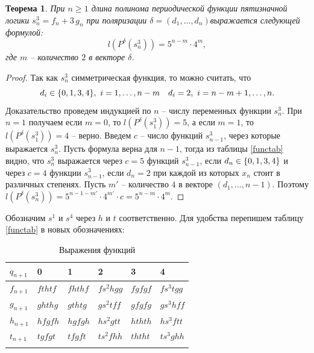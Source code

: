 \documentclass[bibliography=totoc, a4paper, 14pt]{extarticle}
\newtheorem{myth}{Теорема}
\def\in{\mathchar"3232\nobreak\discretionary{}{\usefont{OMS}{cmsy}{m}{n}\char50}{}}
\begin{document}
\begin{myth}
\label{ths3}
При $n \geqslant 1$ длина полинома периодической функции пятизначной логики ${s^3_n = f_n + 3\,g_n}$
при поляризации $\delta = (d_1,\ldots,d_n)$выражается следующей формулой:
$$ l(P^{\delta}(s^3_n)) = 5^{n-m} \cdot 4^m ,$$
где $m$ -- количество $2$ в векторе $\delta$.
\end{myth}
\begin{proof}
Так как $s^3_n$ симметрическая функция, то можно считать, что
$$d_i \in \{0,1,3,4\},\ i=1,\dots,n-m \quad d_i = 2,\ i=n-m+1,\dots,n.$$
Доказательство проведем индукцией по $n$ -- числу переменных функции $s^3_n$.
При $n = 1$ получаем если $m=0$, то $l(P^{\delta}(s^3_1)) = 5$, а если $m=1$, то
$l(P^{\delta}(s^3_1))=4$ -- верно. Введем $c$ -- число функций $s^3_{n-1}$, через которые
выражается $s^3_n$. Пусть формула верна для ${n-1}$, тогда из таблицы \ref{functab} видно, что
$s^3_n$ выражается через $c=5$ функций $s^3_{n-1}$, если ${d_n \in \{0,1,3,4\}}$ и через $c=4$
функции $s^3_{n-1}$, если $d_n = 2$ при каждой из которых $x_n$ стоит в различных степенях.
Пусть $m'$ -- количество $4$ в векторе $(d_1,\dots,n-1)$.
Поэтому ${l(P^{\delta}(s^3_n)) = 5^{n-1-m'} \cdot 4^{m'} \cdot c = 5^{n-m}\cdot4^m}$.
\end{proof}



Обозначим $s^1$ и $s^4$ через $h$ и $t$ соответственно.
Для удобства перепишем таблицу \ref{functab} в новых обозначениях:

\begin{center}
\begin{longtable}{| l | l | l | l | l | l |}

\hline $q_{n+1}$ & 0 & 1 & 2 & 3 & 4 \\
\hline

$f_{n+1}$ & $f t h t f$ & $f h t h f$ & $f s^2 h g g$ & $f g f g f$ & $f s^3 t g g$
\\ \hline

$g_{n+1}$ & $g h t h g$ & $g t h t g$ & $g s^2 t f f$ & $g f g f g$ & $g s^3 h f f$
\\ \hline

$h_{n+1}$ & $h f g f h$ & $h g f g h$ & $h s^2 g t t$ & $h t h t h$ & $h s^3 f t t$
\\ \hline

$t_{n+1}$ & $t g f g t$ & $t f g f t$ & $t s^2 f h h$ & $t h t h t$ & $t s^3 g h h$
\\ \hline

\caption{Выражения функций}
\label{functab2}
\end{longtable}
\end{center}
\end{document}
